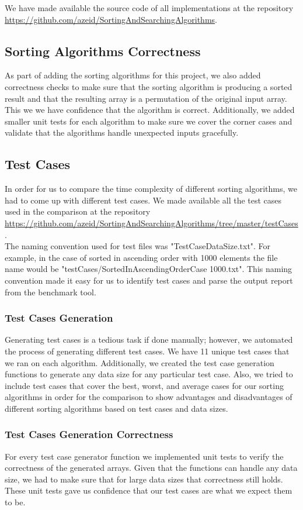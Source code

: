 We have made available the source code of all implementations at the repository \url{https://github.com/azeid/SortingAndSearchingAlgorithms}.

\subsection{Sorting Algorithms Correctness}
As part of adding the sorting algorithms for this project, we also added correctness checks to make sure that the sorting algorithm is producing a sorted result and that the resulting array is a permutation of the original input array. This we we have confidence that the algorithm is correct. Additionally, we added smaller unit tests for each algorithm to make sure we cover the corner cases and validate that the algorithms handle unexpected inputs gracefully.

\subsection{Test Cases}
In order for us to compare the time complexity of different sorting algorithms, we had to come up with different test cases. We made available all the test cases used in the comparison at the repository \url{https://github.com/azeid/SortingAndSearchingAlgorithms/tree/master/testCases}.\\
The naming convention used for test files was "TestCase\textunderscore DataSize.txt". For example, in the case of sorted in ascending order with 1000 elements the file name would be "testCases/SortedInAscendingOrderCase \textunderscore 1000.txt". This naming convention made it easy for us to identify test cases and parse the output report from the benchmark tool.

\subsubsection{Test Cases Generation}
Generating test cases is a tedious task if done manually; however, we automated the process of generating different test cases. We have 11 unique test cases that we ran on each algorithm. Additionally, we created the test case generation functions to generate any data size for any particular test case. Also, we tried to include test cases that cover the best, worst, and average cases for our sorting algorithms in order for the comparison to show advantages and disadvantages of different sorting algorithms based on test cases and data sizes.

\subsubsection{Test Cases Generation Correctness}
For every test case generator function we implemented unit tests to verify the correctness of the generated arrays. Given that the functions can handle any data size, we had to make sure that for large data sizes that correctness still holds. These unit tests gave us confidence that our test cases are what we expect them to be.

